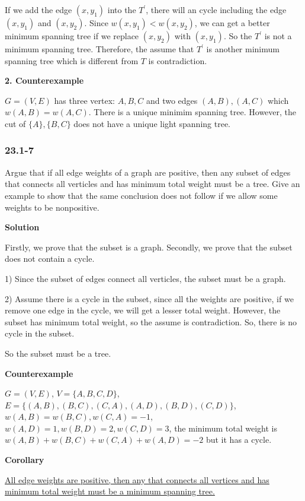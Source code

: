 If we add the edge $(x, y_1)$ into the $T^{'}$, there will an cycle including
the edge $(x, y_1)$ and $(x, y_2)$. Since $w(x, y_1) < w(x, y_2)$, we can get
a better minimum spanning tree if we replace $(x, y_2)$ with $(x, y_1)$. So the
$T^{'}$ is not a minimum spanning tree. Therefore, the assume that $T^{'}$ is
another minimum spanning tree which is different from $T$ is contradiction.

\textbf{2. Counterexample}

$G=(V, E)$ has three vertex: $A, B, C$ and two edges $(A, B), (A, C)$ which
$w(A, B) = w(A, C)$. There is a unique minimim spanning tree. However, the cut
of $\{A\}, \{B, C\}$ does not have a unique light spanning tree.

\subsubsection {23.1-7}

Argue that if all edge weights of a graph are positive, then any subset of edges
that connects all verticles and has minimum total weight must be a tree. Give an
example to show that the same conclusion does not follow if we allow some
weights to be nonpositive.

\textbf{Solution}

Firstly, we prove that the subset is a graph. Secondly, we prove that the subset
does not contain a cycle.

1) Since the subset of edges connect all verticles, the subset must be a graph.

2) Assume there is a cycle in the subset, since all the weights are positive,
if we remove one edge in the cycle, we will get a lesser total weight. However,
the subset has minimum total weight, so the assume is contradiction. So, there
is no cycle in the subset.

So the subset must be a tree.

\textbf{Counterexample}

$G = (V, E)$, $V = \{ A, B, C, D \}$,
$E = \{ (A, B), (B, C), (C, A), (A, D), (B, D), (C, D) \}$,
$w(A, B) = w(B, C), w(C, A) = -1$, $w(A, D) = 1, w(B, D) = 2, w(C, D) = 3$, the
minimum total weight is $w(A, B) + w(B, C) + w(C, A) + w(A, D) = -2$ but it has
a cycle.

\textbf{Corollary}

\href{http://stackoverflow.com/questions/40518543/is-it-right-all-edge-weights-are-positive-then-any-that-connects-all-vertices}
     {All edge weights are positive, then any that connects all vertices and has
       minimum total weight must be a minimum spanning tree.}


